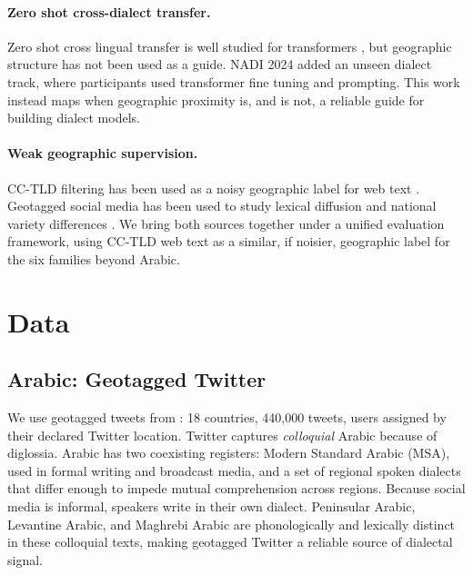 \documentclass[11pt]{article}
\begin{document}
\paragraph{Zero shot cross-dialect transfer.}
Zero shot cross lingual transfer is well studied for transformers \cite{inoue-etal-2021-interplay}, but geographic structure has not been used as a guide.
NADI 2024 \cite{abdul-mageed-etal-2024-nadi} added an unseen dialect track, where participants used transformer fine tuning and prompting.
This work instead maps when geographic proximity is, and is not, a reliable guide for building dialect models.

\paragraph{Weak geographic supervision.}
CC-TLD filtering has been used as a noisy geographic label for web text \cite{nllb-team-2022-language}.
Geotagged social media has been used to study lexical diffusion \cite{eisenstein-etal-2010-latent} and national variety differences \cite{lui-cook-2013-classifying}.
We bring both sources together under a unified evaluation framework, using CC-TLD web text as a similar, if noisier, geographic label for the six families beyond Arabic.

\section{Data}
\label{sec:data}

\subsection{Arabic: Geotagged Twitter}

We use geotagged tweets from \citet{abdelrahman-rezk-2021}: 18 countries, 440{,}000 tweets, users assigned by their declared Twitter location.
Twitter captures \emph{colloquial} Arabic because of diglossia.
Arabic has two coexisting registers: Modern Standard Arabic (MSA), used in formal writing and broadcast media, and a set of regional spoken dialects that differ enough to impede mutual comprehension across regions.
Because social media is informal, speakers write in their own dialect.
Peninsular Arabic, Levantine Arabic, and Maghrebi Arabic are phonologically and lexically distinct in these colloquial texts, making geotagged Twitter a reliable source of dialectal signal.
\end{document}
